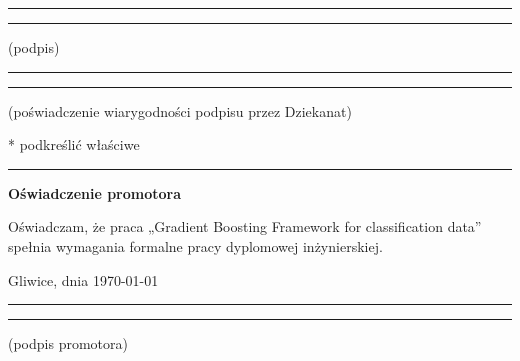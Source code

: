 \documentclass[a4paper,twoside,12pt]{book}
\newcounter{PagesWithoutNumbers}
\newcommand{\Title}{Gradient Boosting Framework for classification data}
\begin{document}
\vfill

\rule{0.5\textwidth}{0cm}\dotfill

\rule{0.5\textwidth}{0cm}
\begin{minipage}{0.45\textwidth}
{\begin{center}(podpis)\end{center}}
\end{minipage}

\vfill

\rule{0.5\textwidth}{0cm}\dotfill

\rule{0.5\textwidth}{0cm}
\begin{minipage}{0.45\textwidth}
{\begin{center}\rule{0mm}{5mm}(poświadczenie wiarygodności podpisu przez Dziekanat)\end{center}}
\end{minipage}


\vfill

* podkreślić właściwe




\cleardoublepage

\rule{1cm}{0cm}

\vfill

\begin{center}
\Large\bfseries Oświadczenie promotora
\end{center}

\vfill

Oświadczam, że praca „\Title” spełnia wymagania formalne pracy dyplomowej inżynierskiej.

\vfill



\vfill

Gliwice, dnia {\today}

\rule{0.5\textwidth}{0cm}\dotfill

\rule{0.5\textwidth}{0cm}
\begin{minipage}{0.45\textwidth}
{\begin{center}(podpis promotora)\end{center}}
\end{minipage}

\vfill



\cleardoublepage


\pagestyle{onlyPageNumbers}
\tableofcontents

\setcounter{PagesWithoutNumbers}{\value{page}}
\mainmatter
\pagestyle{PageNumbersChapterTitles}
\end{document}
